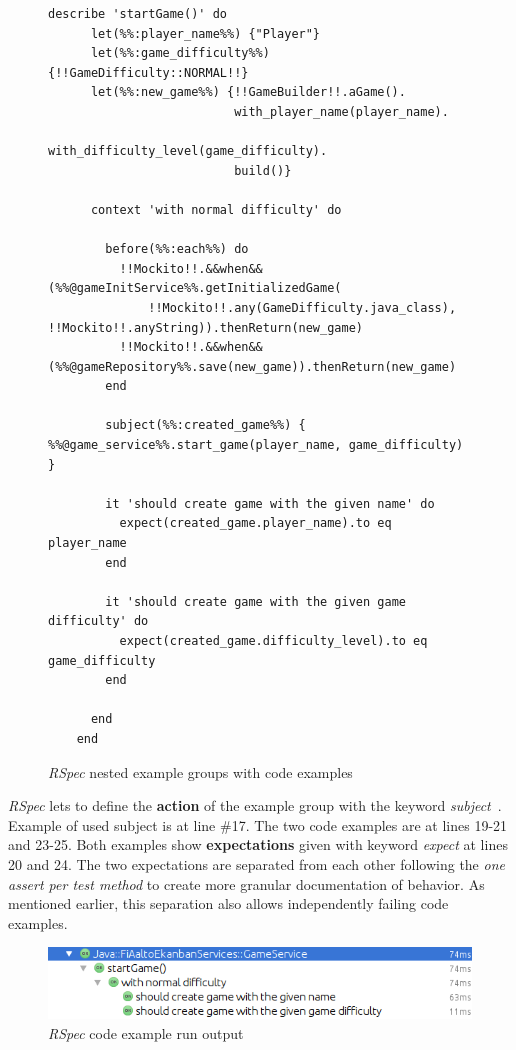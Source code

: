     \begin{figure}[H]
        \begin{lstlisting}[style=ruby]
    describe 'startGame()' do
      let(%%:player_name%%) {"Player"}
      let(%%:game_difficulty%%) {!!GameDifficulty::NORMAL!!}
      let(%%:new_game%%) {!!GameBuilder!!.aGame().
                          with_player_name(player_name).
                          with_difficulty_level(game_difficulty).
                          build()}

      context 'with normal difficulty' do

        before(%%:each%%) do
          !!Mockito!!.&&when&&(%%@gameInitService%%.getInitializedGame(
              !!Mockito!!.any(GameDifficulty.java_class), !!Mockito!!.anyString)).thenReturn(new_game)
          !!Mockito!!.&&when&&(%%@gameRepository%%.save(new_game)).thenReturn(new_game)
        end

        subject(%%:created_game%%) { %%@game_service%%.start_game(player_name, game_difficulty) }

        it 'should create game with the given name' do
          expect(created_game.player_name).to eq player_name
        end

        it 'should create game with the given game difficulty' do
          expect(created_game.difficulty_level).to eq game_difficulty
        end

      end
    end
        \end{lstlisting}
        \caption{\textit{RSpec} nested example groups with code examples}
        \label{fig:rspec-example}
    \end{figure}

    \textit{RSpec} lets to define the \textbf{action} of the example group with the keyword \textit{subject}~\cite{rspec-subject}. Example of used subject is at
    line \#17. The two code examples are at lines 19-21 and 23-25.  Both examples show \textbf{expectations} given with keyword \textit{expect}
    at lines 20 and 24. The two expectations are separated from each other following the \textit{one assert per test method}
    to create more granular documentation of behavior. As mentioned earlier, this separation also allows independently failing code examples.
    \begin{figure}[H]
      \begin{center}
        \begin{topbot}[style=mdstyle]
        \includegraphics[width=\textwidth]{images/rspec-result.png}
        \end{topbot}
        \caption{\textit{RSpec} code example run output}
        \label{fig:rspec-result}
      \end{center}
    \end{figure}

